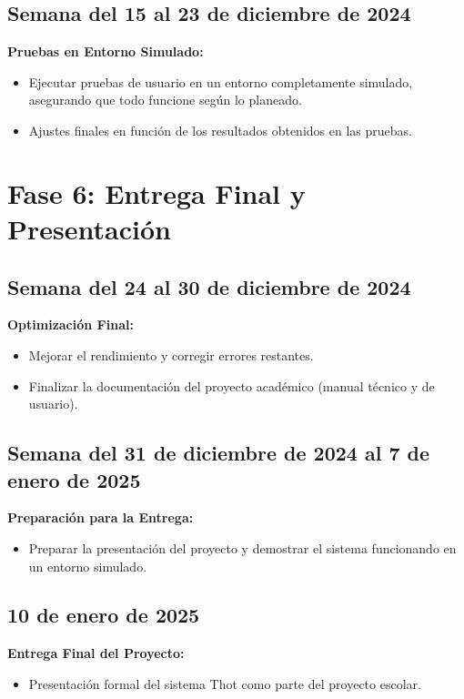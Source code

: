 \documentclass{report}
\begin{document}
    \subsection*{Semana del 15 al 23 de diciembre de 2024}
    \textbf{Pruebas en Entorno Simulado:}
    \begin{itemize}
        \item Ejecutar pruebas de usuario en un entorno completamente simulado, asegurando que todo funcione según lo planeado.
        \item Ajustes finales en función de los resultados obtenidos en las pruebas.
    \end{itemize}

    \section*{Fase 6: Entrega Final y Presentación}
    \subsection*{Semana del 24 al 30 de diciembre de 2024}
    \textbf{Optimización Final:}
    \begin{itemize}
        \item Mejorar el rendimiento y corregir errores restantes.
        \item Finalizar la documentación del proyecto académico (manual técnico y de usuario).
    \end{itemize}

    \subsection*{Semana del 31 de diciembre de 2024 al 7 de enero de 2025}
    \textbf{Preparación para la Entrega:}
    \begin{itemize}
        \item Preparar la presentación del proyecto y demostrar el sistema funcionando en un entorno simulado.
    \end{itemize}

    \subsection*{10 de enero de 2025}
    \textbf{Entrega Final del Proyecto:}
    \begin{itemize}
        \item Presentación formal del sistema Thot como parte del proyecto escolar.
    \end{itemize}
\end{document}
